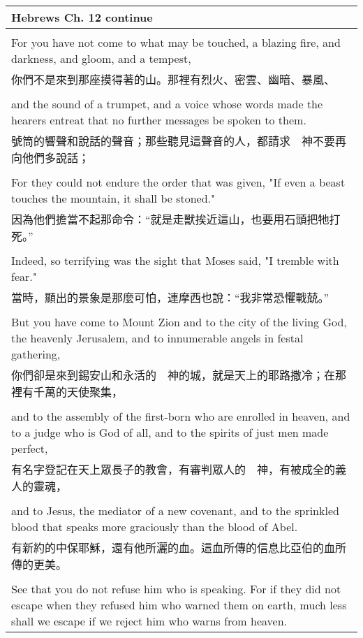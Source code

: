 \begin{tabularx}{\textwidth}{p{}}
\hline
Hebrews Ch. 12 continue \\
\hline \\
For you have not come to what may be touched, a blazing fire, and darkness, and gloom, and a tempest, \\
你們不是來到那座摸得著的山。那裡有烈火、密雲、幽暗、暴風、 \\ \\
and the sound of a trumpet, and a voice whose words made the hearers entreat that no further messages be spoken to them. \\
號筒的響聲和說話的聲音；那些聽見這聲音的人，都請求　神不要再向他們多說話； \\ \\
For they could not endure the order that was given, "If even a beast touches the mountain, it shall be stoned." \\
因為他們擔當不起那命令：“就是走獸挨近這山，也要用石頭把牠打死。” \\ \\
Indeed, so terrifying was the sight that Moses said, "I tremble with fear." \\
當時，顯出的景象是那麼可怕，連摩西也說：“我非常恐懼戰兢。” \\ \\
But you have come to Mount Zion and to the city of the living God, the heavenly Jerusalem, and to innumerable angels in festal gathering, \\
你們卻是來到錫安山和永活的　神的城，就是天上的耶路撒冷；在那裡有千萬的天使聚集， \\ \\
and to the assembly of the first-born who are enrolled in heaven, and to a judge who is God of all, and to the spirits of just men made perfect, \\
有名字登記在天上眾長子的教會，有審判眾人的　神，有被成全的義人的靈魂， \\ \\
and to Jesus, the mediator of a new covenant, and to the sprinkled blood that speaks more graciously than the blood of Abel. \\
有新約的中保耶穌，還有他所灑的血。這血所傳的信息比亞伯的血所傳的更美。 \\ \\
See that you do not refuse him who is speaking. For if they did not escape when they refused him who warned them on earth, much less shall we escape if we reject him who warns from heaven. \\

\end{tabularx}
